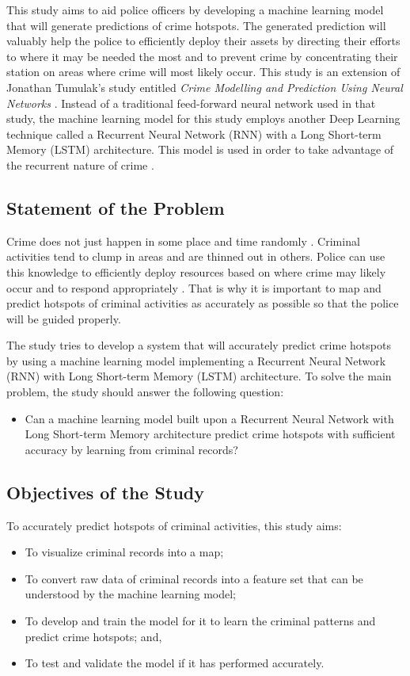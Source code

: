     This study aims to aid police officers by developing a machine learning model that will generate predictions of crime hotspots. The generated prediction will valuably help the police to efficiently deploy their assets by directing their efforts to where it may be needed the most and to prevent crime by concentrating their station on areas where crime will most likely occur. This study is an extension of Jonathan Tumulak's study entitled \textit{Crime Modelling and Prediction Using Neural Networks} \cite{tumulak2015crime}. Instead of a traditional feed-forward neural network used in that study, the machine learning model for this study employs another Deep Learning technique called a Recurrent Neural Network (RNN) with a Long Short-term Memory (LSTM) architecture. This model is used in order to take advantage of the recurrent nature of crime \cite{perc2013understanding}.

\subsection{Statement of the Problem} \label{section:statement-of-the-problem}
    Crime does not just happen in some place and time randomly \cite{brantingham2005modeling}. Criminal activities tend to clump in areas and are thinned out in others. Police can use this knowledge to efficiently deploy resources based on where crime may likely occur and to respond appropriately \cite{eck2005mapping}. That is why it is important to map and predict hotspots of criminal activities as accurately as possible so that the police will be guided properly.

    The study tries to develop a system that will accurately predict crime hotspots by using a machine learning model implementing a Recurrent Neural Network (RNN) with Long Short-term Memory (LSTM) architecture. To solve the main problem, the study should answer the following question:
        \begin{itemize}
        \item Can a machine learning model built upon a Recurrent Neural Network with Long Short-term Memory architecture predict crime hotspots with sufficient accuracy by learning from criminal records?
        \end{itemize}

\subsection{Objectives of the Study} \label{section:objectives-of-the-study}
    To accurately predict hotspots of criminal activities, this study aims:
        \begin{itemize}
        \item To visualize criminal records into a map;
        \item To convert raw data of criminal records into a feature set that can be understood by the machine learning model;
        \item To develop and train the model for it to learn the criminal patterns and predict crime hotspots; and,
        \item To test and validate the model if it has performed accurately.
        \end{itemize}

